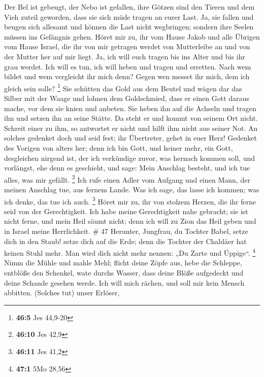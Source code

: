  Der Bel ist gebeugt, der Nebo ist gefallen, ihre Götzen
sind den Tieren und dem Vieh zuteil geworden, dass sie sich müde tragen
an eurer Last.  Ja, sie fallen und beugen sich allesamt und
können die Last nicht wegbringen; sondern ihre Seelen müssen ins
Gefängnis gehen.  Höret mir zu, ihr vom Hause Jakob und alle
Übrigen vom Hause Israel, die ihr von mir getragen werdet von
Mutterleibe an und von der Mutter her auf mir liegt.  Ja,
ich will euch tragen bis ins Alter und bis ihr grau werdet. Ich will es
tun, ich will heben und tragen und erretten.  Nach wem
bildet und wem vergleicht ihr mich denn? Gegen wen messet ihr mich, dem
ich gleich sein solle? \footnote{\textbf{46:5} Jes 44,9-20} 
Sie schütten das Gold aus dem Beutel und wägen dar das Silber mit der
Waage und lohnen dem Goldschmied, dass er einen Gott daraus mache, vor
dem sie knien und anbeten.  Sie heben ihn auf die Achseln
und tragen ihn und setzen ihn an seine Stätte. Da steht er und kommt von
seinem Ort nicht. Schreit einer zu ihm, so antwortet er nicht und hilft
ihm nicht aus seiner Not.  An solches gedenket doch und seid
fest; ihr Übertreter, gehet in euer Herz!  Gedenket des
Vorigen von alters her; denn ich bin Gott, und keiner mehr, ein Gott,
desgleichen nirgend ist,  der ich verkündige zuvor, was
hernach kommen soll, und vorlängst, ehe denn es geschieht, und sage:
Mein Anschlag besteht, und ich tue alles, was mir gefällt. \footnote{\textbf{46:10}
  Jes 42,9}  Ich rufe einen Adler vom Aufgang und einen
Mann, der meinen Anschlag tue, aus fernem Lande. Was ich sage, das lasse
ich kommen; was ich denke, das tue ich auch. \footnote{\textbf{46:11}
  Jes 41,2}  Höret mir zu, ihr von stolzem Herzen, die ihr
ferne seid von der Gerechtigkeit.  Ich habe meine
Gerechtigkeit nahe gebracht; sie ist nicht ferne, und mein Heil säumt
nicht; denn ich will zu Zion das Heil geben und in Israel meine
Herrlichkeit. \# 47  Herunter, Jungfrau, du Tochter Babel,
setze dich in den Staub! setze dich auf die Erde; denn die Tochter der
Chaldäer hat keinen Stuhl mehr. Man wird dich nicht mehr nennen: „Du
Zarte und Üppige``. \footnote{\textbf{47:1} 5Mo 28,56}  Nimm
die Mühle und mahle Mehl; flicht deine Zöpfe aus, hebe die Schleppe,
entblöße den Schenkel, wate durchs Wasser,  dass deine Blöße
aufgedeckt und deine Schande gesehen werde. Ich will mich rächen, und
soll mir kein Mensch abbitten.  (Solches tut) unser Erlöser,
